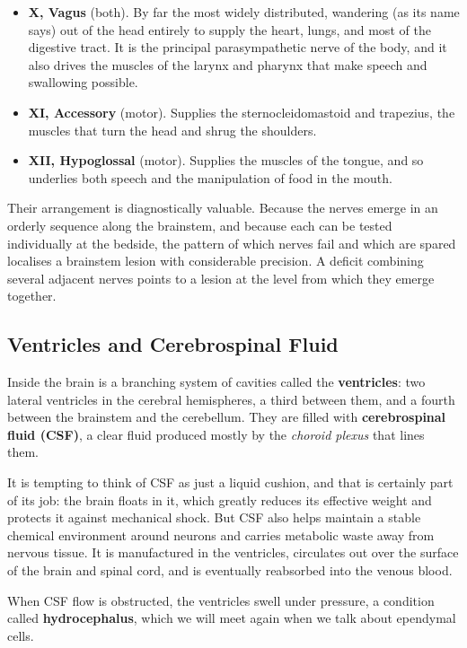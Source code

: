 \documentclass[11pt]{article}
\begin{document}
\begin{itemize}
    \item \textbf{X, Vagus} (both). By far the most widely distributed, wandering (as its name says) out of the head entirely to supply the heart, lungs, and most of the digestive tract. It is the principal parasympathetic nerve of the body, and it also drives the muscles of the larynx and pharynx that make speech and swallowing possible.
    \item \textbf{XI, Accessory} (motor). Supplies the sternocleidomastoid and trapezius, the muscles that turn the head and shrug the shoulders.
    \item \textbf{XII, Hypoglossal} (motor). Supplies the muscles of the tongue, and so underlies both speech and the manipulation of food in the mouth.
\end{itemize}

Their arrangement is diagnostically valuable. Because the nerves emerge in an orderly sequence along the brainstem, and because each can be tested individually at the bedside, the pattern of which nerves fail and which are spared localises a brainstem lesion with considerable precision. A deficit combining several adjacent nerves points to a lesion at the level from which they emerge together.

\subsection{Ventricles and Cerebrospinal Fluid}

Inside the brain is a branching system of cavities called the \textbf{ventricles}: two lateral ventricles in the cerebral hemispheres, a third between them, and a fourth between the brainstem and the cerebellum. They are filled with \textbf{cerebrospinal fluid (CSF)}, a clear fluid produced mostly by the \textit{choroid plexus} that lines them.

It is tempting to think of CSF as just a liquid cushion, and that is certainly part of its job: the brain floats in it, which greatly reduces its effective weight and protects it against mechanical shock. But CSF also helps maintain a stable chemical environment around neurons and carries metabolic waste away from nervous tissue. It is manufactured in the ventricles, circulates out over the surface of the brain and spinal cord, and is eventually reabsorbed into the venous blood.

When CSF flow is obstructed, the ventricles swell under pressure, a condition called \textbf{hydrocephalus}, which we will meet again when we talk about ependymal cells.
\end{document}
